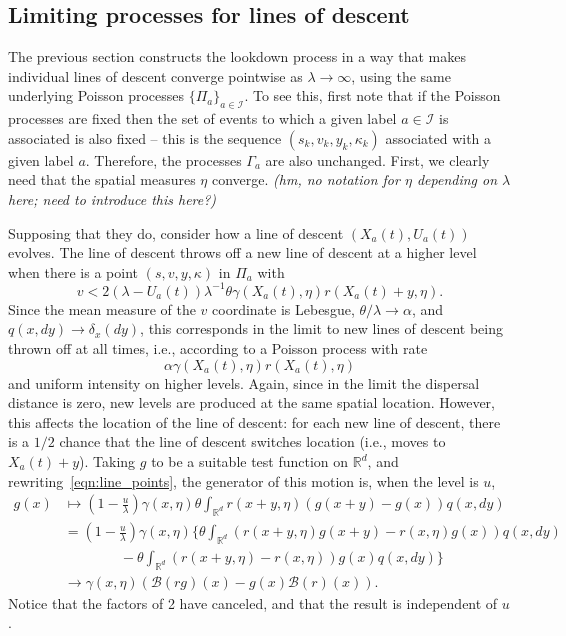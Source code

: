 \documentclass[12pt]{article}
\newcommand{\IR}{\mathbb R}
\newcommand{\DG}{\mathcal{B}}  %
\newcommand{\labelspace}{\mathcal{I}} %
\newcommand{\comment}[1]{{\color{blue} \it #1}}
\begin{document}
\subsection{Limiting processes for lines of descent}
\label{sec:limiting_lines_of_descent}

The previous section constructs the lookdown process
in a way that makes individual lines of descent converge pointwise as $\lambda \to \infty$,
using the same underlying Poisson processes $\{\Pi_a\}_{a \in \labelspace}$.
To see this, first note that if the Poisson processes are fixed
then the set of events to which a given label $a \in \labelspace$ is associated
is also fixed -- this is the sequence $(s_k, v_k, y_k, \kappa_k)$ associated with a given label $a$.
Therefore, the processes $\Gamma_a$ are also unchanged.
First, we clearly need that the spatial measures $\eta$ converge.
\comment{(hm, no notation for $\eta$ depending on $\lambda$ here; need to introduce this here?)}

Supposing that they do,
consider how a line of descent $(X_a(t), U_a(t))$ evolves.
The line of descent throws off a new line of descent at a higher level
when there is a point $(s, v, y, \kappa)$ in $\Pi_a$ with 
\begin{equation} \label{eqn:line_points}
v < 2 (\lambda - U_a(t)) \lambda^{-1} \theta \gamma(X_a(t), \eta) r(X_a(t)+y, \eta) .
\end{equation}
Since the mean measure of the $v$ coordinate is Lebesgue,
$\theta/\lambda \to \alpha$,
and $q(x, dy) \to \delta_x(dy)$,
this corresponds in the limit to new lines of descent being thrown off at all times,
i.e., according to a Poisson process with rate
$$
\alpha \gamma(X_a(t), \eta) r(X_a(t), \eta) 
$$
and uniform intensity on higher levels.
Again, since in the limit the dispersal distance is zero,
new levels are produced at the same spatial location.
However, this affects the location of the line of descent:
for each new line of descent, there is a $1/2$ chance
that the line of descent switches location (i.e., moves to $X_a(t) + y$).
Taking $g$ to be a suitable test function on $\IR^d$, 
and rewriting~\eqref{eqn:line_points},
the generator of this motion is, when the level is $u$,
\begin{align*}
    g(x)
    &\mapsto
    \left(1 - \frac{u}{\lambda}\right) \gamma(x, \eta)
    \theta \int_{\IR^d} r(x+y, \eta) (g(x+y) - g(x)) q(x, dy) \\
    &=
    \left(1 - \frac{u}{\lambda}\right) \gamma(x, \eta)
    \bigg\{
        \theta \int_{\IR^d} (r(x+y, \eta) g(x+y) - r(x, \eta) g(x)) q(x, dy) \\
        &\qquad \qquad {}
        -
        \theta \int_{\IR^d} (r(x+y, \eta) - r(x, \eta) ) g(x) q(x, dy) 
    \bigg\} \\
    &\to
    \gamma(x, \eta)
    \left(
        \DG(rg)(x) - g(x) \DG(r)(x)
    \right) .
\end{align*}
Notice that the factors of 2 have canceled,
and that the result is independent of $u$.
\end{document}
